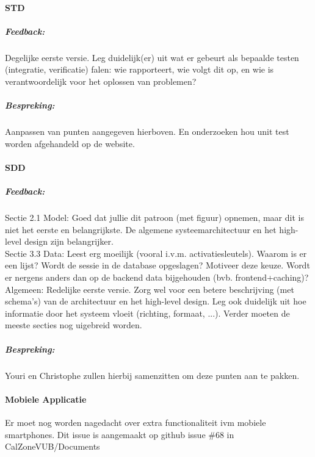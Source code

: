 \paragraph{STD}
\subparagraph{Feedback:}
Degelijke eerste versie.
Leg duidelijk(er) uit wat er gebeurt als bepaalde testen (integratie, verificatie) falen: wie rapporteert, wie volgt dit op, en wie is verantwoordelijk voor het oplossen van problemen?

\subparagraph{Bespreking:}
Aanpassen van punten aangegeven hierboven. En onderzoeken hou unit test worden afgehandeld op de website.

\paragraph{SDD}
\subparagraph{Feedback:}
Sectie 2.1 Model: Goed dat jullie dit patroon (met figuur) opnemen, maar dit is niet het eerste en belangrijkste.
De algemene systeemarchitectuur en het high-level design zijn belangrijker.
\\
Sectie 3.3 Data: Leest erg moeilijk (vooral i.v.m. activatiesleutels). Waarom is er een lijst?
Wordt de sessie in de database opgeslagen? Motiveer deze keuze.
Wordt er nergens anders dan op de backend data bijgehouden (bvb. frontend+caching)?
\\
Algemeen: Redelijke eerste versie. Zorg wel voor een betere beschrijving (met schema's) van de architectuur en het high-level design.
Leg ook duidelijk uit hoe informatie door het systeem vloeit (richting, formaat, ...).
Verder moeten de meeste secties nog uigebreid worden.
\subparagraph{Bespreking:}
Youri en Christophe zullen hierbij samenzitten om deze punten aan te pakken.

\paragraph{Mobiele Applicatie}
Er moet nog worden nagedacht over extra functionaliteit ivm mobiele smartphones. Dit issue is aangemaakt op github issue \#68 in CalZoneVUB/Documents

 

